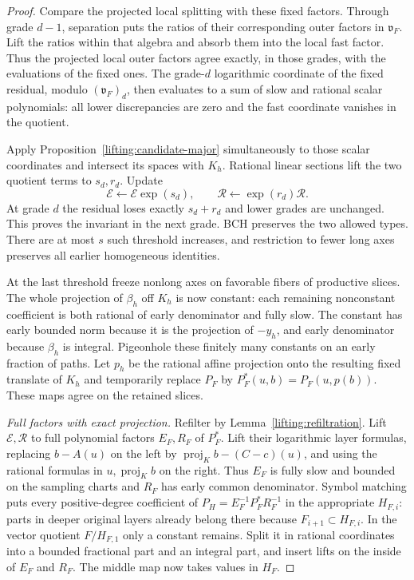\begin{proof}
Compare the projected local splitting with these fixed factors.
Through grade $d-1$, separation puts the ratios of their corresponding
outer factors in $\mathfrak v_F$.  Lift the ratios within that
algebra and absorb them into the local fast factor.  Thus the
projected local outer factors agree exactly, in those grades, with
the evaluations of the fixed ones.  The grade-$d$ logarithmic
coordinate of the fixed residual, modulo $(\mathfrak v_F)_d$,
then evaluates to a sum of slow and rational scalar polynomials:
all lower discrepancies are zero and the fast coordinate vanishes
in the quotient.

Apply Proposition~\ref{lifting:candidate-major} simultaneously to
those scalar coordinates and intersect its spaces with $K_h$.
Rational linear sections lift the two quotient terms to $s_d,r_d$.
Update
\[
 \mathcal E\longleftarrow\mathcal E\exp(s_d),\qquad
 \mathcal R\longleftarrow\exp(r_d)\mathcal R.
\]
At grade $d$ the residual loses exactly $s_d+r_d$ and lower grades
are unchanged.  This proves the invariant in the next grade.
BCH preserves the two allowed types.  There are at most $s$ such
threshold increases, and restriction to fewer long axes preserves
all earlier homogeneous identities.

At the last threshold freeze nonlong axes on favorable fibers of
productive slices.  The whole projection of $\beta_h$ off $K_h$
is now constant: each remaining nonconstant coefficient is both
rational of early denominator and fully slow.  The constant has
early bounded norm because it is the projection of $-y_h$, and early
denominator because $\beta_h$ is integral.  Pigeonhole these finitely
many constants on an early fraction of paths.  Let $p_h$ be the
rational affine projection onto the resulting fixed translate of
$K_h$ and temporarily replace $P_F$ by
$P_F^*(u,b)=P_F(u,p(b))$.  These maps agree on the retained slices.

\emph{Full factors with exact projection.}
Refilter by Lemma~\ref{lifting:refiltration}.  Lift
$\mathcal E,\mathcal R$ to full polynomial factors $E_F,R_F$ of
$P_F^*$.  Lift their logarithmic layer formulas, replacing $b-A(u)$
on the left by $\operatorname{proj}_K b-(C-c)(u)$, and using the
rational formulas in $u,\operatorname{proj}_K b$ on the right.
Thus $E_F$ is fully slow and bounded on the sampling charts and
$R_F$ has early common denominator.  Symbol matching puts every
positive-degree coefficient of
$P_H=E_F^{-1}P_F^*R_F^{-1}$ in the appropriate $H_{F,i}$: parts in
deeper original layers already belong there because
$F_{i+1}\subset H_{F,i}$.  In the vector quotient $F/H_{F,1}$ only
a constant remains.  Split it in rational coordinates into a bounded
fractional part and an integral part, and insert lifts on the inside
of $E_F$ and $R_F$.  The middle map now takes values in $H_F$.


\end{proof}
